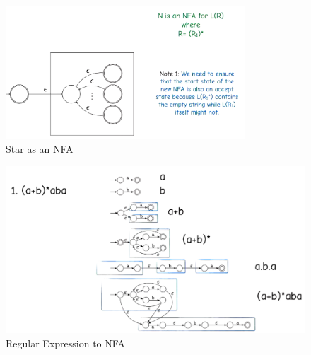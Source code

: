 \documentclass[a4paper]{article}
\theoremstyle{plain}
\theoremstyle{definition}
\newtheorem{defn}{Definition}[section]
\newtheorem{exmp}{Example}[section]
\theoremstyle{remark}
\begin{document}
\begin{tcolorbox}[colback=black!3!white,colframe=black!60!white,title=\begin{defn}Star \label{Star}\end{defn}]
\begin{figure}[H]
	\centering
	\includegraphics[width=0.8\textwidth]{four.png}
	\caption{Star as an NFA}
	\label{fig:four-png}
\end{figure}
\end{tcolorbox}
\begin{tcolorbox}[colback=black!3!white,colframe=black!60!white,title=\begin{exmp}Regular Expression to NFA \label{Regular Expression to NFA}\end{exmp}]
        \begin{figure}[H]
        	\centering
        	\includegraphics[width=1\textwidth]{five.png}
        	\caption{Regular Expression to NFA}
        	\label{fig:five-png}
        \end{figure}
                \begin{align}
                
                \end{align}
	\end{tcolorbox}
\end{document}
